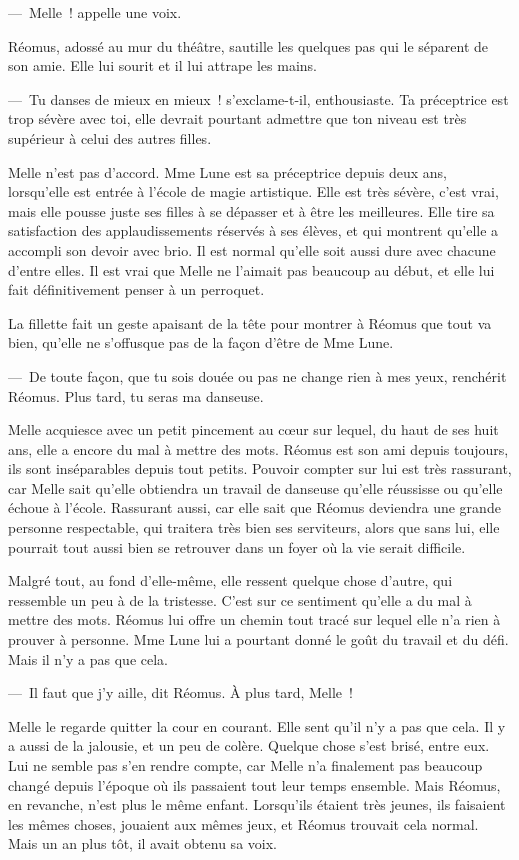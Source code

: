 ---~Melle~! appelle une voix.

Réomus, adossé au mur du théâtre, sautille les quelques pas qui le séparent de son amie. Elle lui sourit et il lui attrape les mains.

---~Tu danses de mieux en mieux~! s'exclame-t-il, enthousiaste. Ta préceptrice est trop sévère avec toi, elle devrait pourtant admettre que ton niveau est très supérieur à celui des autres filles.

Melle n'est pas d'accord. Mme Lune est sa préceptrice depuis deux ans, lorsqu'elle est entrée à l'école de magie artistique. Elle est très sévère, c'est vrai, mais elle pousse juste ses filles à se dépasser et à être les meilleures. Elle tire sa satisfaction des applaudissements réservés à ses élèves, et qui montrent qu'elle a accompli son devoir avec brio. Il est normal qu'elle soit aussi dure avec chacune d'entre elles. Il est vrai que Melle ne l'aimait pas beaucoup au début, et elle lui fait définitivement penser à un perroquet.

La fillette fait un geste apaisant de la tête pour montrer à Réomus que tout va bien, qu'elle ne s'offusque pas de la façon d'être de Mme Lune.

---~De toute façon, que tu sois douée ou pas ne change rien à mes yeux, renchérit Réomus. Plus tard, tu seras ma danseuse.

Melle acquiesce avec un petit pincement au cœur sur lequel, du haut de ses huit ans, elle a encore du mal à mettre des mots. Réomus est son ami depuis toujours, ils sont inséparables depuis tout petits. Pouvoir compter sur lui est très rassurant, car Melle sait qu'elle obtiendra un travail de danseuse qu'elle réussisse ou qu'elle échoue à l'école. Rassurant aussi, car elle sait que Réomus deviendra une grande personne respectable, qui traitera très bien ses serviteurs, alors que sans lui, elle pourrait tout aussi bien se retrouver dans un foyer où la vie serait difficile.

Malgré tout, au fond d'elle-même, elle ressent quelque chose d'autre, qui ressemble un peu à de la tristesse. C'est sur ce sentiment qu'elle a du mal à mettre des mots. Réomus lui offre un chemin tout tracé sur lequel elle n'a rien à prouver à personne. Mme Lune lui a pourtant donné le goût du travail et du défi. Mais il n'y a pas que cela.

---~Il faut que j'y aille, dit Réomus. À plus tard, Melle~!

Melle le regarde quitter la cour en courant. Elle sent qu'il n'y a pas que cela. Il y a aussi de la jalousie, et un peu de colère. Quelque chose s'est brisé, entre eux. Lui ne semble pas s'en rendre compte, car Melle n'a finalement pas beaucoup changé depuis l'époque où ils passaient tout leur temps ensemble. Mais Réomus, en revanche, n'est plus le même enfant. Lorsqu'ils étaient très jeunes, ils faisaient les mêmes choses, jouaient aux mêmes jeux, et Réomus trouvait cela normal. Mais un an plus tôt, il avait obtenu sa voix.

